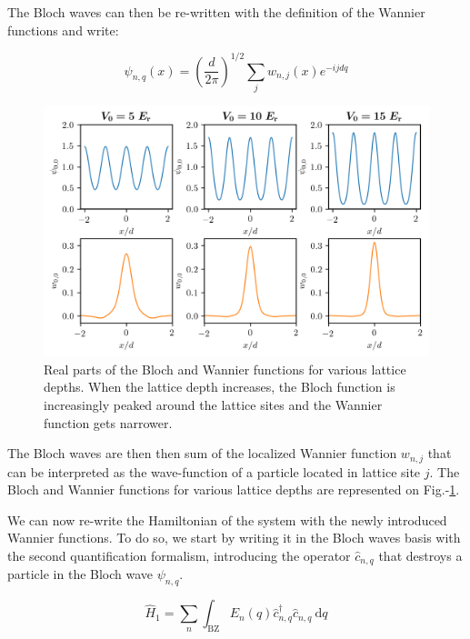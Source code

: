 The Bloch waves can then be re-written with the definition of the Wannier functions and write:

\begin{equation}
    \psi_{n, q}(x)=\left(\frac{d}{2 \pi}\right)^{1 / 2} \sum_{j} w_{n, j}(x) e^{-i j d q}
    \label{eq:bloch_as_wannier}
\end{equation}


\begin{figure}
    \centering
    \includegraphics[width=\textwidth]{Fig/Chapter2/bloch_wannier.png}
    \caption{Real parts of the Bloch and Wannier functions for various lattice depths. When the lattice depth increases, the Bloch function is increasingly peaked around the lattice sites and the Wannier function gets narrower.}
    \label{fig:bloch_wannier}
\end{figure}

\noindent The Bloch waves are then then sum of the localized Wannier function $w_{n, j}$ that can be interpreted as the wave-function of a particle located in lattice site $j$. The Bloch and Wannier functions for various lattice depths are represented on Fig.-\ref{fig:bloch_wannier}.

We can now re-write the Hamiltonian of the system with the newly introduced Wannier functions. To do so, we start by writing it in the Bloch waves basis with the second quantification formalism, introducing the operator $\hat{c}_{n,q}$ that destroys a particle in the Bloch wave $\psi_{n,q}$.

\begin{equation}
    \hat{H}_{1}=\sum_{n} \int_{\mathrm{BZ}} E_{n}(q) \hat{c}_{n, q}^{\dagger} \hat{c}_{n, q} \mathrm{~d} q
    \label{eq:H_bloch}
\end{equation}

